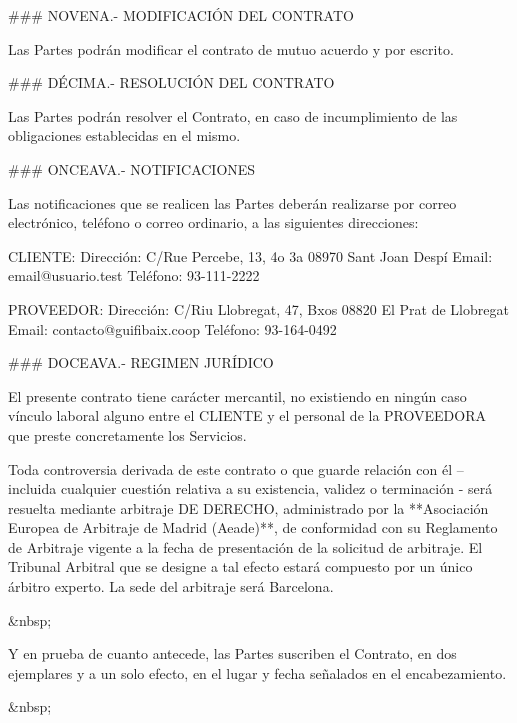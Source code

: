 ### NOVENA.- MODIFICACIÓN DEL CONTRATO

Las Partes podrán modificar el contrato de mutuo acuerdo y por escrito.


### DÉCIMA.- RESOLUCIÓN DEL CONTRATO

Las Partes podrán resolver el Contrato,
en caso de incumplimiento de las obligaciones establecidas en el mismo.

### ONCEAVA.- NOTIFICACIONES

Las notificaciones que se realicen las Partes deberán realizarse por correo electrónico, teléfono o correo ordinario, a las siguientes direcciones:

	CLIENTE:
		Dirección:	C/Rue Percebe, 13, 4o 3a
					08970 Sant Joan Despí
		Email: 		email@usuario.test
		Teléfono:	93-111-2222

	PROVEEDOR:
		Dirección:	C/Riu Llobregat, 47, Bxos
					08820 El Prat de Llobregat
		Email: 		contacto@guifibaix.coop
		Teléfono:	93-164-0492




### DOCEAVA.- REGIMEN JURÍDICO

El presente contrato tiene carácter mercantil,
no existiendo en ningún caso vínculo laboral alguno entre el CLIENTE
y el personal de la PROVEEDORA que preste concretamente los Servicios.

Toda controversia derivada de este contrato o que guarde relación con él
– incluida cualquier cuestión relativa a su existencia, validez o terminación -
será resuelta mediante arbitraje DE DERECHO, administrado por la
**Asociación Europea de Arbitraje de Madrid (Aeade)**,
de conformidad con su Reglamento de Arbitraje
vigente a la fecha de presentación de la solicitud de arbitraje.
El Tribunal Arbitral que se designe a tal efecto estará compuesto por un único árbitro experto.
La sede del arbitraje será Barcelona.

&nbsp;

Y en prueba de cuanto antecede, las Partes suscriben el Contrato, en dos ejemplares y a un solo efecto, en el lugar y fecha señalados en el encabezamiento.

&nbsp;



